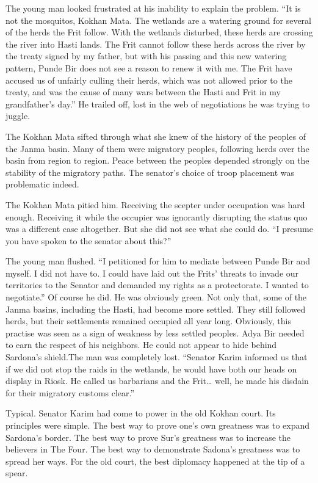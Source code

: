 \documentclass{article}
\begin{document}
	The young man looked frustrated at his inability to explain the problem. “It is not the mosquitos, Kokhan Mata. The wetlands are a watering ground for several of the herds the Frit follow. With the wetlands disturbed, these herds are crossing the river into Hasti lands. The Frit cannot follow these herds across the river by the treaty signed by my father, but with his passing and this new watering pattern, Punde Bir does not see a reason to renew it with me. The Frit have accused us of unfairly culling their herds, which was not allowed prior to the treaty, and was the cause of many wars between the Hasti and Frit in my grandfather’s day.” He trailed off, lost in the web of negotiations he was trying to juggle. 
	
	The Kokhan Mata sifted through what she knew of the history of the peoples of the Janma basin. Many of them were migratory peoples, following herds over the basin from region to region. Peace between the peoples depended strongly on the stability of the migratory paths. The senator’s choice of troop placement was problematic indeed. 
	
	The Kokhan Mata pitied him. Receiving the scepter under occupation was hard enough. Receiving it while the occupier was ignorantly disrupting the status quo was a different case altogether. But she did not see what she could do. “I presume you have spoken to the senator about this?”
	
	The young man flushed. “I petitioned for him to mediate between Punde Bir and myself. I did not have to. I could have laid out the Frits' threats to invade our territories to the Senator and demanded my rights as a protectorate. I wanted to negotiate.” Of course he did. He was obviously green. Not only that, some of the Janma basins, including the Hasti, had become more settled. They still followed herds, but their settlements remained occupied all year long. Obviously, this practise was seen as a sign of weakness by less settled peoples. Adya Bir needed to earn the respect of his neighbors. He could not appear to hide behind Sardona’s shield.The man was completely lost. “Senator Karim informed us that if we did not stop the raids in the wetlands, he would have both our heads on display in Riosk. He called us barbarians and the Frit… well, he made his disdain for their migratory customs clear.” 
	
	Typical. Senator Karim had come to power in the old Kokhan court. Its principles were simple. The best way to prove one’s own greatness was to expand Sardona’s border. The best way to prove Sur’s greatness was to increase the believers in The Four. The best way to demonstrate Sadona’s greatness was to spread her ways. For the old court, the best diplomacy happened at the tip of a spear.
	
\end{document}
